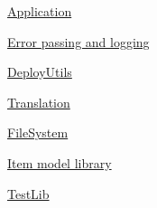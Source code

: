 \hyperlink{libs_Application}{Application}

\hyperlink{libs_Error}{Error passing and logging}

\hyperlink{libs_DeployUtils}{Deploy\+Utils}

\hyperlink{libs_Translation}{Translation}

\hyperlink{libs_FileSystem}{File\+System}

\hyperlink{libs_ItemModel}{Item model library}

\hyperlink{libs_TestLib}{Test\+Lib} 